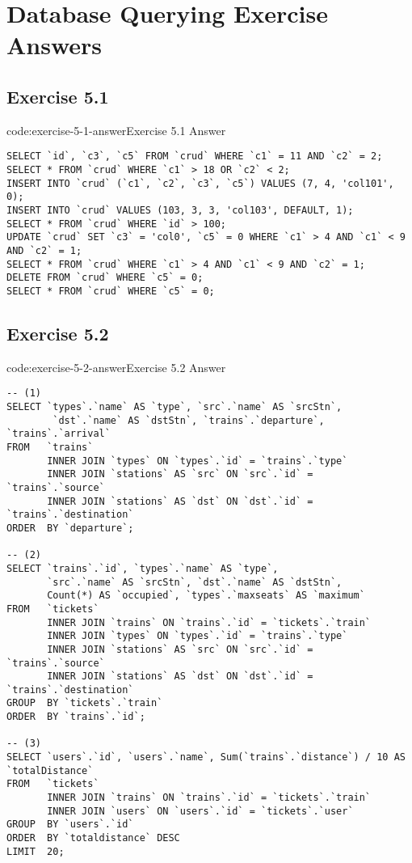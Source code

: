 \section{Database Querying Exercise Answers}\label{sect:database-querying-answers}

\subsection*{Exercise 5.1}

\begin{codeenv}{code:exercise-5-1-answer}{Exercise 5.1 Answer}\begin{verbatim}
SELECT `id`, `c3`, `c5` FROM `crud` WHERE `c1` = 11 AND `c2` = 2;
SELECT * FROM `crud` WHERE `c1` > 18 OR `c2` < 2;
INSERT INTO `crud` (`c1`, `c2`, `c3`, `c5`) VALUES (7, 4, 'col101', 0);
INSERT INTO `crud` VALUES (103, 3, 3, 'col103', DEFAULT, 1);
SELECT * FROM `crud` WHERE `id` > 100;
UPDATE `crud` SET `c3` = 'col0', `c5` = 0 WHERE `c1` > 4 AND `c1` < 9 AND `c2` = 1;
SELECT * FROM `crud` WHERE `c1` > 4 AND `c1` < 9 AND `c2` = 1;
DELETE FROM `crud` WHERE `c5` = 0;
SELECT * FROM `crud` WHERE `c5` = 0;
\end{verbatim}
\end{codeenv}

\subsection*{Exercise 5.2}

\begin{codeenv}{code:exercise-5-2-answer}{Exercise 5.2 Answer}\begin{verbatim}
-- (1)
SELECT `types`.`name` AS `type`, `src`.`name` AS `srcStn`,
        `dst`.`name` AS `dstStn`, `trains`.`departure`, `trains`.`arrival`
FROM   `trains`
       INNER JOIN `types` ON `types`.`id` = `trains`.`type`
       INNER JOIN `stations` AS `src` ON `src`.`id` = `trains`.`source`
       INNER JOIN `stations` AS `dst` ON `dst`.`id` = `trains`.`destination`
ORDER  BY `departure`;

-- (2)
SELECT `trains`.`id`, `types`.`name` AS `type`,
       `src`.`name` AS `srcStn`, `dst`.`name` AS `dstStn`,
       Count(*) AS `occupied`, `types`.`maxseats` AS `maximum`
FROM   `tickets`
       INNER JOIN `trains` ON `trains`.`id` = `tickets`.`train`
       INNER JOIN `types` ON `types`.`id` = `trains`.`type`
       INNER JOIN `stations` AS `src` ON `src`.`id` = `trains`.`source`
       INNER JOIN `stations` AS `dst` ON `dst`.`id` = `trains`.`destination`
GROUP  BY `tickets`.`train`
ORDER  BY `trains`.`id`;

-- (3)
SELECT `users`.`id`, `users`.`name`, Sum(`trains`.`distance`) / 10 AS `totalDistance`
FROM   `tickets`
       INNER JOIN `trains` ON `trains`.`id` = `tickets`.`train`
       INNER JOIN `users` ON `users`.`id` = `tickets`.`user`
GROUP  BY `users`.`id`
ORDER  BY `totaldistance` DESC
LIMIT  20;
\end{verbatim}
\end{codeenv}

